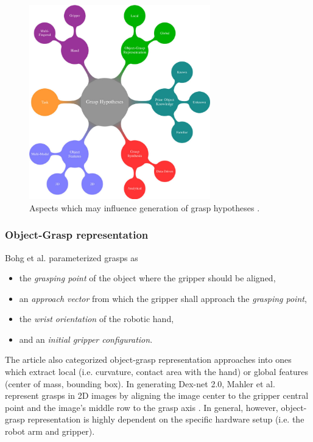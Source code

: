 \documentclass[12pt]{article}
\begin{document}
    \begin{figure}[H]
        \centering
        \includegraphics[width=0.7\textwidth]{bohg14-grasp_synthesis_mind_map}
        \caption{Aspects which may influence generation of grasp hypotheses \cite{Bohg2014}.}
        \label{fig:grasp_synthesis_mind_map}
    \end{figure}

    \subsubsection{Object-Grasp representation}
    Bohg et al. \cite{Bohg2014} parameterized grasps as
    \begin{itemize}
        \item the \emph{grasping point} of the object where the gripper should be aligned,
        \item an \emph{approach vector} from which the gripper shall approach the \emph{grasping point},
        \item the \emph{wrist orientation} of the robotic hand,
        \item and an \emph{initial gripper configuration}.
    \end{itemize}
    The article also categorized object-grasp representation approaches into ones which extract local (i.e. curvature, contact area with the hand) or global features (center of mass, bounding box). In generating Dex-net 2.0, Mahler et al. represent grasps in 2D images by aligning the image center to the gripper central point and the image's middle row to the grasp axis \cite{mahler2017}. In general, however, object-grasp representation is highly dependent on the specific hardware setup (i.e. the robot arm and gripper).
\end{document}
